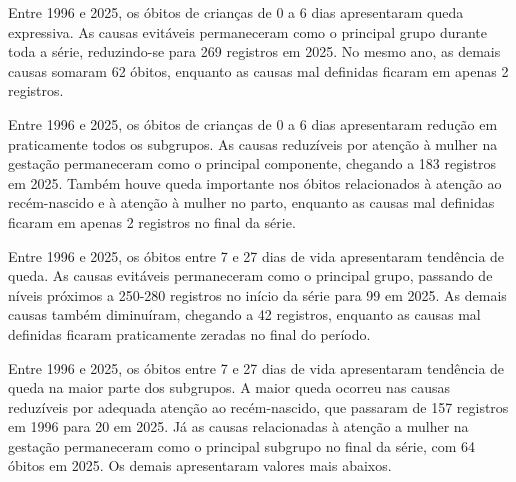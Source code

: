 
Entre 1996 e 2025, os óbitos de crianças de 0 a 6 dias apresentaram queda expressiva.  As causas evitáveis permaneceram como o principal grupo durante toda a série, reduzindo-se para 269 registros em 2025. No mesmo ano, as demais causas somaram 62 óbitos, enquanto as causas mal definidas ficaram em apenas 2 registros.


Entre 1996 e 2025, os óbitos de crianças de 0 a 6 dias apresentaram redução em praticamente todos os subgrupos. As causas reduzíveis por atenção à mulher na gestação permaneceram como o principal componente, chegando a 183 registros em 2025. Também houve queda importante nos óbitos relacionados à atenção ao recém-nascido e à atenção à mulher no parto, enquanto as causas mal definidas ficaram em apenas 2 registros no final da série.


Entre 1996 e 2025, os óbitos entre 7 e 27 dias de vida apresentaram tendência de queda. As causas evitáveis permaneceram como o principal grupo, passando de níveis próximos a 250-280 registros no início da série para 99 em 2025. As demais causas também diminuíram, chegando a 42 registros, enquanto as causas mal definidas ficaram praticamente zeradas no final do período.


Entre 1996 e 2025, os óbitos entre 7 e 27 dias de vida apresentaram tendência de queda na maior parte dos subgrupos.  A maior queda ocorreu nas causas reduzíveis por adequada atenção ao recém-nascido, que passaram de 157 registros em 1996 para 20 em 2025. Já as causas relacionadas à atenção a mulher na gestação permaneceram como o principal subgrupo no final da série, com 64 óbitos em 2025. Os demais apresentaram valores mais abaixos.

